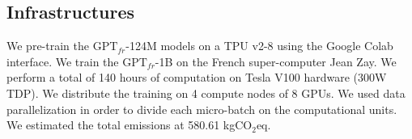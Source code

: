 \begin{table}[!ht]
\footnotesize
{}
\caption{ Statistics of the architectures and comparison with OpenAI models \parencite{radford_2018, radford_2019}.}
\end{table}

\subsection{Infrastructures}

We pre-train the $\text{GPT}_{fr}$-124M models on a TPU v2-8 using the Google Colab interface. We train the $\text{GPT}_{fr}$-1B on the French super-computer Jean Zay. We perform a total of 140 hours of computation on Tesla V100 hardware (300W TDP). We distribute the training on 4 compute nodes of 8 GPUs. We used data parallelization in order to divide each micro-batch on the computational units. We estimated the total emissions at 580.61 kgCO$_2$eq.

